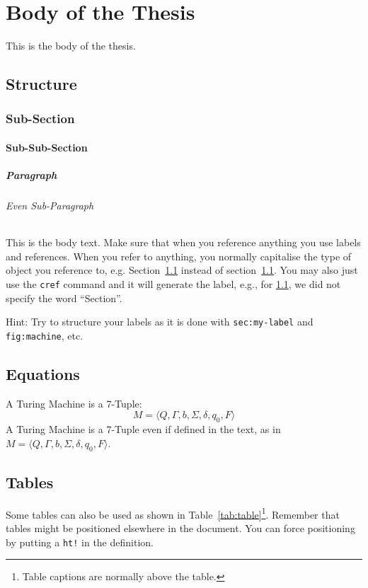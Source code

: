 \chapter{Body of the Thesis}

This is the body of the thesis.

\section{Structure}
\label{sec:my-label}

\subsection{Sub-Section}

\subsubsection{Sub-Sub-Section}

\paragraph{Paragraph}

\subparagraph{Even Sub-Paragraph}

This is the body text. Make sure that when you reference anything you use labels and references. When you refer to anything, you normally capitalise the type of object you reference to, e.g. Section~\ref{sec:my-label} instead of section~\ref{sec:my-label}. You may also just use the \texttt{cref} command and it will generate the label, e.g., for \cref{sec:my-label}, we did not specify the word ``Section''.

Hint: Try to structure your labels as it is done with \texttt{sec:my-label} and \texttt{fig:machine}, etc.



\section{Equations}
A Turing Machine is a 7-Tuple:
\begin{equation}
    M = \langle Q, \Gamma, b, \Sigma, \delta, q_0, F \rangle
\end{equation}
A Turing Machine is a 7-Tuple even if defined in the text, as in $M = \langle Q, \Gamma, b, \Sigma, \delta, q_0, F \rangle$.




\section{Tables}
Some tables can also be used as shown in Table~\ref{tab:table}\footnote{Table captions are normally above the table.}. Remember that tables might be positioned elsewhere in the document. You can force positioning by putting a \texttt{ht!} in the definition.

